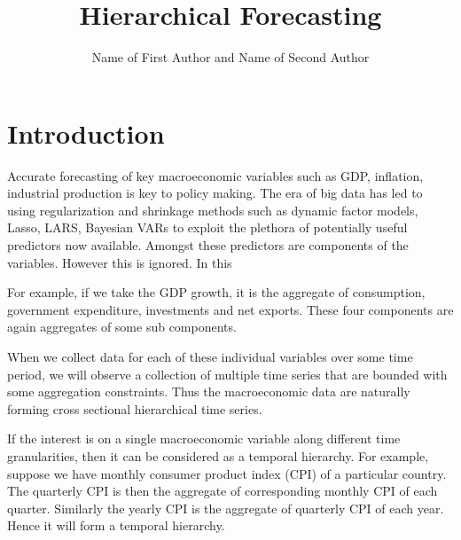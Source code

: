 \documentclass[graybox]{svmult}
\begin{document}
\title*{Hierarchical Forecasting}
\author{Name of First Author and Name of Second Author}
%
%
\maketitle



\section{Introduction}\label{sec:intro}
			
Accurate forecasting of key macroeconomic variables such as GDP, inflation, industrial production is key to policy making. The era of big data has led to using regularization and shrinkage methods such as dynamic factor models, Lasso, LARS, Bayesian VARs to exploit the plethora of potentially useful predictors now available. Amongst these predictors are components of the variables. However this is ignored. In this 


 
For example, if we take the GDP growth, it is the aggregate of consumption, government expenditure, investments and net exports. These four components are again aggregates of some sub components. 

When we collect data for each of these individual variables over some time period, we will observe a collection of multiple time series that are bounded with some aggregation constraints. Thus the macroeconomic data are naturally forming cross sectional hierarchical time series.

If the interest is on a single macroeconomic variable along different time granularities, then it can be considered as a temporal hierarchy. For example, suppose we have monthly consumer product index (CPI) of a particular country. The quarterly CPI is then the aggregate of corresponding monthly CPI of each quarter. Similarly the yearly CPI is the aggregate of quarterly CPI of each year. Hence it will form a temporal hierarchy.
\end{document}
